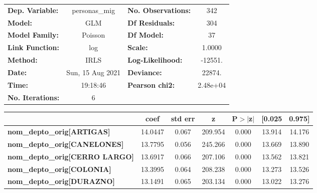 \begin{center}
\begin{tabular}{lclc}
\toprule
\textbf{Dep. Variable:}                    &  personas\_mig   & \textbf{  No. Observations:  } &      342    \\
\textbf{Model:}                            &       GLM        & \textbf{  Df Residuals:      } &      304    \\
\textbf{Model Family:}                     &     Poisson      & \textbf{  Df Model:          } &       37    \\
\textbf{Link Function:}                    &       log        & \textbf{  Scale:             } &    1.0000   \\
\textbf{Method:}                           &       IRLS       & \textbf{  Log-Likelihood:    } &   -12551.   \\
\textbf{Date:}                             & Sun, 15 Aug 2021 & \textbf{  Deviance:          } &    22874.   \\
\textbf{Time:}                             &     19:18:46     & \textbf{  Pearson chi2:      } &  2.48e+04   \\
\textbf{No. Iterations:}                   &        6         & \textbf{                     } &             \\
\bottomrule
\end{tabular}
\begin{tabular}{lcccccc}
                                           & \textbf{coef} & \textbf{std err} & \textbf{z} & \textbf{P$> |$z$|$} & \textbf{[0.025} & \textbf{0.975]}  \\
\midrule
\textbf{nom\_depto\_orig[ARTIGAS]}         &      14.0447  &        0.067     &   209.954  &         0.000        &       13.914    &       14.176     \\
\textbf{nom\_depto\_orig[CANELONES]}       &      13.7795  &        0.056     &   245.266  &         0.000        &       13.669    &       13.890     \\
\textbf{nom\_depto\_orig[CERRO LARGO]}     &      13.6917  &        0.066     &   207.106  &         0.000        &       13.562    &       13.821     \\
\textbf{nom\_depto\_orig[COLONIA]}         &      13.3995  &        0.064     &   208.238  &         0.000        &       13.273    &       13.526     \\
\textbf{nom\_depto\_orig[DURAZNO]}         &      13.1491  &        0.065     &   203.134  &         0.000        &       13.022    &       13.276     \\

\end{tabular}
\end{center}
